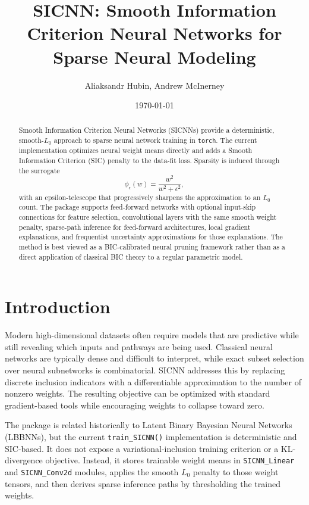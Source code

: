 \documentclass{article}
\title{SICNN: Smooth Information Criterion Neural Networks for Sparse Neural Modeling}
\author{Aliaksandr Hubin, Andrew McInerney}
\date{\today}
\begin{document}
\maketitle

\begin{abstract}
Smooth Information Criterion Neural Networks (SICNNs) provide a deterministic, smooth-$L_0$ approach to sparse neural network training in \texttt{torch}. The current implementation optimizes neural weight means directly and adds a Smooth Information Criterion (SIC) penalty to the data-fit loss. Sparsity is induced through the surrogate
\[
\phi_\epsilon(w)=\frac{w^2}{w^2+\epsilon^2},
\]
with an epsilon-telescope that progressively sharpens the approximation to an $L_0$ count. The package supports feed-forward networks with optional input-skip connections for feature selection, convolutional layers with the same smooth weight penalty, sparse-path inference for feed-forward architectures, local gradient explanations, and frequentist uncertainty approximations for those explanations. The method is best viewed as a BIC-calibrated neural pruning framework rather than as a direct application of classical BIC theory to a regular parametric model.
\end{abstract}

\section{Introduction}
Modern high-dimensional datasets often require models that are predictive while still revealing which inputs and pathways are being used. Classical neural networks are typically dense and difficult to interpret, while exact subset selection over neural subnetworks is combinatorial. SICNN addresses this by replacing discrete inclusion indicators with a differentiable approximation to the number of nonzero weights. The resulting objective can be optimized with standard gradient-based tools while encouraging weights to collapse toward zero.

The package is related historically to Latent Binary Bayesian Neural Networks (LBBNNs), but the current \texttt{train\_SICNN()} implementation is deterministic and SIC-based. It does not expose a variational-inclusion training criterion or a KL-divergence objective. Instead, it stores trainable weight means in \texttt{SICNN\_Linear} and \texttt{SICNN\_Conv2d} modules, applies the smooth $L_0$ penalty to those weight tensors, and then derives sparse inference paths by thresholding the trained weights.
\end{document}
